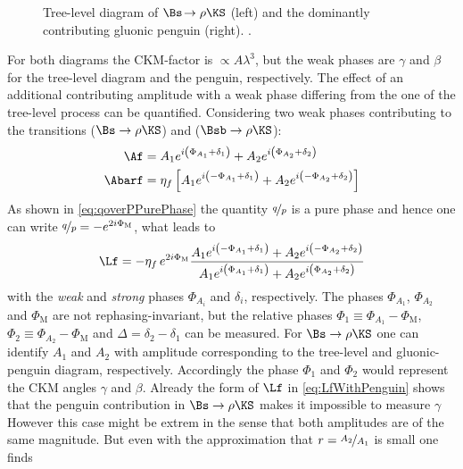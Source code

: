\begin{figure}[tbp]
	\centering
	
	
	\caption{Tree-level diagram of $\Bs\!\to\rho\KS$ (left) and the dominantly contributing gluonic penguin (right). \cite{Ellis:2016jkw}.}
	\label{fig:Bs2RhoKS}
\end{figure}
For both diagrams the CKM-factor is $\propto A\lambda^3$, but the weak phases are $\gamma$ and $\beta$ for the tree-level diagram and the penguin, respectively.
The effect of an additional contributing amplitude with a weak phase differing from the one of the tree-level process can be quantified.
Considering two weak phases contributing to the transitions \Af ($\Bs\to\rho\KS$) and \Abarf ($\Bsb\to\rho\KS$):
\begin{equation}
\begin{aligned}
\Af&=A_1e^{i\left(\Phi_{A_1}+\delta_1\right)}+A_2e^{i\left(\Phi_{A_2}+\delta_2\right)}\\
\Abarf&=\eta_f\left[A_1e^{i\left(-\Phi_{A_1}+\delta_1\right)}+A_2e^{i\left(-\Phi_{A_2}+\delta_2\right)}\right]
\end{aligned}
\end{equation}
As shown in \cref{eq:qoverPPurePhase} the quantity $\nicefrac{q}{p}$ is a pure phase and hence one can write $\nicefrac{q}{p}=-e^{2i\Phi_\text{M}}$, what leads to
\begin{equation}
\Lf=-\eta_f\,e^{2i\Phi_\text{M}}\frac{ A_1 e^{i\left(-\Phi_{A_1}+\delta_1\right)} + A_2 e^{i\left(-\Phi_{A_2}+\delta_2\right)}}{A_1e^{i\left(\Phi_{A_1}+\delta_1\right)}+A_2e^{i\left(\Phi_{A_2}+\delta_2\right)}} \label{eq:LfWithPenguin}
\end{equation}
with the \emph{weak} and \emph{strong} phases $\Phi_{A_i}$ and $\delta_i$, respectively.
The phases $\Phi_{A_1}$, $\Phi_{A_2}$ and $\Phi_\text{M}$ are not rephasing-invariant, but the relative phases $\Phi_1\equiv\Phi_{A_1}-\Phi_\text{M}$, $\Phi_2\equiv\Phi_{A_2}-\Phi_\text{M}$ and $\Delta=\delta_2-\delta_1$ can be measured.
For $\Bs\to\rho\KS$ one can \eg identify $A_1$ and $A_2$ with amplitude corresponding to the tree-level and gluonic-penguin diagram, respectively.
Accordingly the phase $\Phi_1$ and $\Phi_2$ would represent the CKM angles $\gamma$ and $\beta$.
Already the form of $\Lf$ in \cref{eq:LfWithPenguin} shows that the penguin contribution in $\Bs\to\rho\KS$ makes it impossible to measure $\gamma$
However this case might be extrem in the sense that both amplitudes are of the same magnitude.
But even with the approximation that $r=\nicefrac{A_2}{A_1}$ is small one finds
